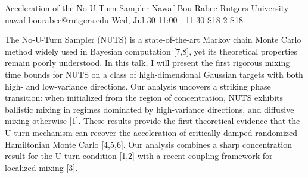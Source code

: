 \begin{talk}
  {Acceleration of the No-U-Turn Sampler}%
  {Nawaf Bou-Rabee}%
  {Rutgers University}%
  {nawaf.bourabee@rutgers.edu}%
  {}%
  {}%
  {Wed, Jul 30 11:00---11:30}%
  {S18-2}%
  {S18}%
  {}%
  
    
   

\medskip

The No-U-Turn Sampler (NUTS) is a state-of-the-art Markov chain Monte Carlo method widely used in Bayesian computation [7,8], yet its theoretical properties remain poorly understood. In this talk, I will present the first rigorous mixing time bounds for NUTS on a class of high-dimensional Gaussian targets with both high- and low-variance directions. Our analysis uncovers a striking phase transition: when initialized from the region of concentration, NUTS exhibits ballistic mixing in regimes dominated by high-variance directions, and diffusive mixing otherwise [1]. These results provide the first theoretical evidence that the U-turn mechanism can recover the acceleration of critically damped randomized Hamiltonian Monte Carlo [4,5,6].  Our analysis combines a sharp concentration result for the U-turn condition [1,2] with a recent coupling framework for localized mixing [3]. 


\end{talk}
